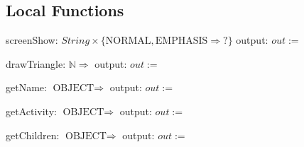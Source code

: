 \documentclass[12pt]{article}
\begin{document}
\subsection*{Local Functions}

\noindent screenShow: $String\times\{\mbox{NORMAL},\mbox{EMPHASIS}\Rightarrow?\}$
\noindent output: $out := $ %

\noindent drawTriangle: $ \mathbb{N} \Rightarrow $
\noindent output: $out := $

\noindent getName: $ \mbox{OBJECT} \Rightarrow $
\noindent output: $out := $

\noindent getActivity: $ \mbox{OBJECT} \Rightarrow $
\noindent output: $out := $

\noindent getChildren: $ \mbox{OBJECT} \Rightarrow $
\noindent output: $out := $





\end{document}
